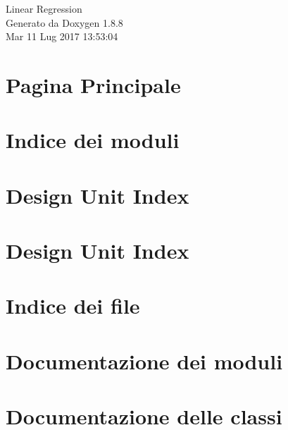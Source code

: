 \documentclass[twoside]{book}
\newcommand{\+}{\discretionary{\mbox{\scriptsize$\hookleftarrow$}}{}{}}
\newcommand{\clearemptydoublepage}{%
  \newpage{\pagestyle{empty}\cleardoublepage}%
}
\begin{document}
\hypersetup{pageanchor=false,
             bookmarks=true,
             bookmarksnumbered=true,
             pdfencoding=unicode
            }
\begin{titlepage}
\vspace*{7cm}
\begin{center}%
{\Large Linear Regression }\\
\vspace*{1cm}
{\large Generato da Doxygen 1.8.8}\\
\vspace*{0.5cm}
{\small Mar 11 Lug 2017 13:53:04}\\
\end{center}
\end{titlepage}
\clearemptydoublepage
\tableofcontents
\clearemptydoublepage
{}
\hypersetup{pageanchor=true}

\chapter{Pagina Principale}
\label{index}\hypertarget{index}{}
\chapter{Indice dei moduli}

\chapter{Design Unit Index}

\chapter{Design Unit Index}

\chapter{Indice dei file}

\chapter{Documentazione dei moduli}




\chapter{Documentazione delle classi}












\end{document}

